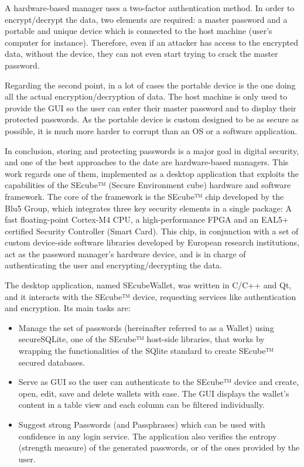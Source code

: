 A hardware-based manager uses a two-factor authentication method. In order to encrypt/decrypt the data, two elements are required: a master password and a portable and unique device which is connected to the host machine (user's computer for instance). Therefore, even if an attacker has access to the encrypted data, without the device, they can not even start trying to crack the master password. 

Regarding the second point, in a lot of cases the portable device is the one doing all the actual encryption/decryption of data. The host machine is only used to provide the GUI so the user can enter their master password and to display their protected passwords. As the portable device is custom designed to be as secure as possible, it is much more harder to corrupt than an OS or a software application.

\vspace{10pt}
In conclusion, storing and protecting passwords is a major goal in digital security, and one of the best approaches to the date are hardware-based managers. This work regards one of them, implemented as a desktop application that exploits the capabilities of the SEcube™ (Secure Environment cube) hardware and software framework. The core of the framework is the SEcube™ chip developed by the Blu5 Group\citep{Blu5}, which integrates three key security elements in a single package: A fast floating-point Cortex-M4 CPU, a high-performance FPGA and an EAL5+ certified Security Controller (Smart Card). This chip, in conjunction with a set of custom device-side software libraries\cite{SEcubeRes} developed by European research institutions, act as the password manager's hardware device, and is in charge of authenticating the user and encrypting/decrypting the data.

The desktop application, named SEcubeWallet, was written in C/C++ and Qt, and it interacts with the SEcube™ device, requesting services like authentication and encryption. Its main tasks are:
\begin{itemize}
\setlength\itemsep{-3pt}
\item Manage the set of passwords (hereinafter referred to as a Wallet) using secureSQLite, one of the SEcube™ host-side libraries, that works by wrapping the functionalities of the SQlite standard to create SEcube™ secured databases.
\item Serve as GUI so the user can authenticate to the SEcube™ device and create, open, edit, save and delete wallets with ease. The GUI displays the wallet's content in a table view and each column can be filtered individually.
\item Suggest strong Passwords (and Passphrases) which can be used with confidence in any login service. The application also verifies the entropy (strength measure) of the generated passwords, or of the ones provided by the user.
\end{itemize}



